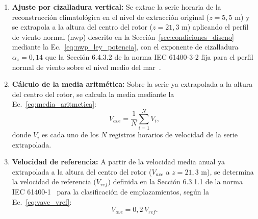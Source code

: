 \begin{enumerate}
    \renewcommand{\labelenumi}{\alph{enumi})}
    \item \textbf{Ajuste por cizalladura vertical:} Se extrae la serie horaria de la reconstrucción climatológica en el nivel de extracción original ($z = 5{,}5$ m) y se extrapola a la altura del centro del rotor ($z = 21{,}3$ m) aplicando el perfil de viento normal (\gls{nwp}) descrito en la Sección~\ref{sec:condiciones_diseno} mediante la Ec.~\ref{eq:nwp_ley_potencia}, con el exponente de cizalladura $\alpha_z = 0{,}14$ que la Sección 6.4.3.2 de la norma IEC 61400-3-2 fija para el perfil normal de viento sobre el nivel medio del mar~\parencite*{IEC61400-3-2}.

    \item \textbf{Cálculo de la media aritmética:} Sobre la serie ya extrapolada a la altura del centro del rotor, se calcula la media mediante la Ec.~\ref{eq:media_aritmetica}:
    \begin{equation}
        V_{ave} = \frac{1}{N} \sum_{i=1}^{N} V_i,
        \label{eq:media_aritmetica}
    \end{equation}
    donde $V_i$ es cada uno de los $N$ registros horarios de velocidad de la serie extrapolada.

    \item \textbf{Velocidad de referencia:} A partir de la velocidad media anual ya extrapolada a la altura del centro del rotor ($V_{ave}$ a $z = 21{,}3$ m), se determina la velocidad de referencia ($V_{ref}$) definida en la Sección 6.3.1.1 de la norma IEC 61400-1~\parencite*{IEC61400-1} para la clasificación de emplazamientos, según la Ec.~\ref{eq:vave_vref}:
    \begin{equation}
        V_{ave} = 0{,}2 \, V_{ref}.
        \label{eq:vave_vref}
    \end{equation}


\end{enumerate}
